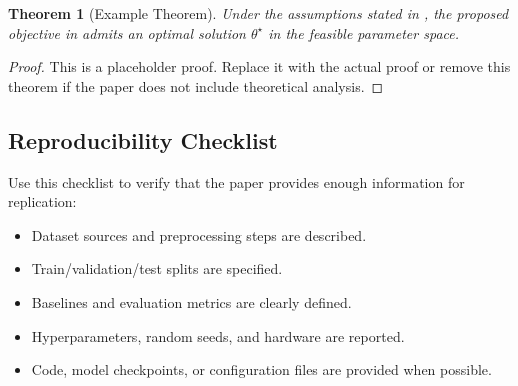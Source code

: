 \documentclass{article}
\theoremstyle{plain}
\newtheorem{theorem}{Theorem}[section]
\theoremstyle{definition}
\theoremstyle{remark}
\begin{document}
\begin{theorem}[Example Theorem]
Under the assumptions stated in , the proposed objective in  admits an optimal solution $\theta^{\star}$ in the feasible parameter space.
\end{theorem}

\begin{proof}
This is a placeholder proof. Replace it with the actual proof or remove this theorem if the paper does not include theoretical analysis.
\end{proof}

\subsection{Reproducibility Checklist}
Use this checklist to verify that the paper provides enough information for replication:
\begin{itemize}
    \item Dataset sources and preprocessing steps are described.
    \item Train/validation/test splits are specified.
    \item Baselines and evaluation metrics are clearly defined.
    \item Hyperparameters, random seeds, and hardware are reported.
    \item Code, model checkpoints, or configuration files are provided when possible.
\end{itemize}
\end{document}

